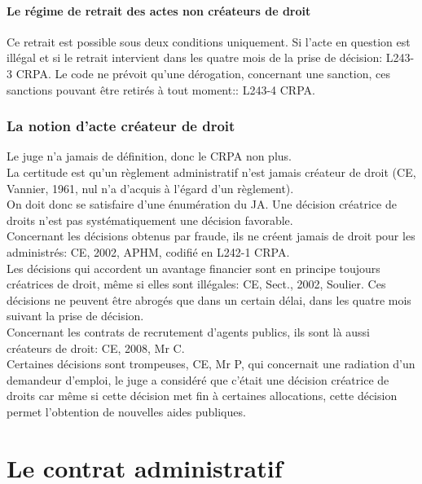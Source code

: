 \documentclass[10pt, a4paper, openany]{book}
\begin{document}
\subsubsection{Le régime de retrait des actes non créateurs de droit}

Ce retrait est possible sous deux conditions uniquement. Si l'acte en question est illégal et si le retrait intervient dans les quatre mois de la prise de décision: L243-3 CRPA. Le code ne prévoit qu'une dérogation, concernant une sanction, ces sanctions pouvant être retirés à tout moment:: L243-4 CRPA. 

\subsection{La notion d'acte créateur de droit}

Le juge n'a jamais de définition, donc le CRPA non plus. \\
La certitude est qu'un règlement administratif n'est jamais créateur de droit (CE, Vannier, 1961, nul n'a d'acquis à l'égard d'un règlement). \\
On doit donc se satisfaire d'une énumération du JA. Une décision créatrice de droits n'est pas systématiquement une décision favorable. \\
Concernant les décisions obtenus par fraude, ils ne créent jamais de droit pour les administrés: CE, 2002, APHM, codifié en L242-1 CRPA. \\
Les décisions qui accordent un avantage financier sont en principe toujours créatrices de droit, même si elles sont illégales: CE, Sect., 2002, Soulier. Ces décisions ne peuvent être abrogés que dans un certain délai, dans les quatre mois suivant la prise de décision. \\
Concernant les contrats de recrutement d'agents publics, ils sont là aussi créateurs de droit: CE, 2008, Mr C. \\
Certaines décisions sont trompeuses, CE, Mr P, qui concernait une radiation d'un demandeur d'emploi, le juge a considéré que c'était une décision créatrice de droits car même si cette décision met fin à certaines allocations, cette décision permet l'obtention de nouvelles aides publiques. 


\chapter{Le contrat administratif}
\end{document}
